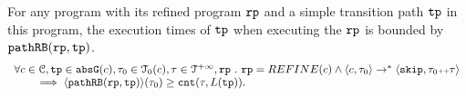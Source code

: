 \begin{lemma}
  For any program with its refined program $\mathtt{rp}$ and a simple transition path $\mathtt{tp}$ in this program,
  the execution times of $\mathtt{tp}$ when executing the $\mathtt{rp}$ is bounded by $\mathtt{pathRB}(\mathtt{rp}, \mathtt{tp})$.
  \[
    \begin{array}{l}
    \forall c \in \mathcal{C}, \mathtt{tp} \in \mathtt{abs}{\mathtt{G}}(c), \mathtt{\tau}_0 \in \mathcal{T}_0(c), \mathtt{\tau} \in \mathcal{T}^{+\infty}, \mathtt{rp} ~.~ 
    \mathtt{rp} = REFINE(c)
    \land
    \langle c, \mathtt{\tau}_0 \rangle \to^* 
    \langle {\ensuremath{\mathtt{skip}}, \ensuremath{\mathtt{\tau}}_0 {\scriptscriptstyle ++}\ensuremath{\mathtt{\tau}}} \rangle
    \\ \qquad
    \implies
    \langle \mathtt{pathRB}(\mathtt{rp}, \mathtt{tp}) \rangle(\mathtt{\tau}_0) \geq \mathtt{cnt}(\mathtt{\tau}, L(\mathtt{tp})).
    \end{array}
    \]
\end{lemma}
%
